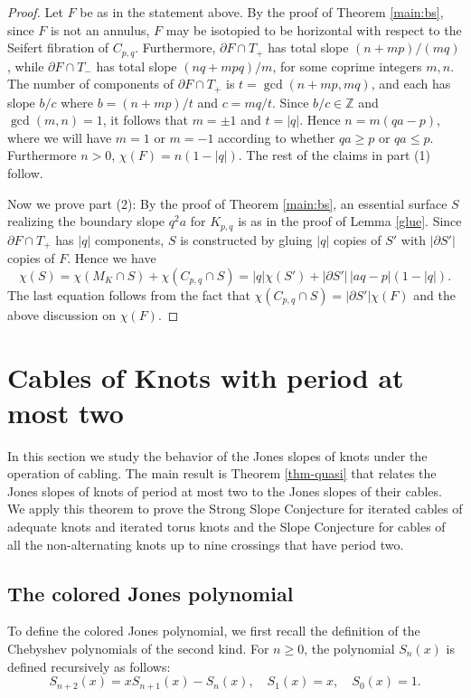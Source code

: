 \documentclass[11pt]{amsart}
\theoremstyle{definition}
\newcommand{\ZZ}{{\mathbb{Z}}}
\newcommand{\C}{{C_{p, q}}}
\newcommand{\K}{{K_{p, q}}}
\newcommand{\abs}[1]{{\left\vert #1 \right\vert}}
\begin{document}
\begin{proof} Let $F$ be as in the statement above.
By the proof of Theorem \ref{main:bs}, since $F$ is not an annulus, $ F$ may be isotopied to be horizontal with respect to the Seifert fibration of $\C$.
Furthermore, $\partial F\cap T_{+}$
has total  slope  $(n+mp)/(mq)$, while 
$\partial F\cap T_{-}$ has total slope  $ (nq +mpq)/m$,
for some coprime  integers $m,n$.
The number of components of $\partial F\cap T_{+}$ is $t= \gcd(n+mp, mq)$,
and each has slope $b/c$ where $b=(n+mp)/t$ and $c=mq/t$.
Since  $b/c\in \ZZ$ and $\gcd(m,n)=1$, it follows that $m=\pm1$ and $t=\abs{q}$.
Hence 
 $n=m(qa-p)$, where we will have $m=1$ or $m=-1$ according to whether $qa\geq p$
or $qa\leq p$. Furthermore $n>0$, $\chi(F)=n(1-\abs{q})$. 
The rest of the claims  in part (1) follow.

Now we prove part (2): By the proof of Theorem \ref{main:bs}, an essential  surface $S$ realizing the boundary slope $q^2a$ for $\K$ 
is as in the proof of Lemma \ref{glue}. Since   $\partial F\cap T_{+}$  has $\abs{q}$ components, $S$ is constructed by 
gluing  $\abs{q}$ copies of $S'$ with $ \abs{ \partial S'}$ copies of $F$. Hence we have
$$\chi(S)=\chi(M_K\cap S)+\chi(\C \cap S)=\abs{q}  \chi(S')+\abs{\partial S'} \, \abs{aq-p} (1- \abs{q} ).$$
The last equation follows from the fact that
$\chi(\C \cap S)=\abs{\partial S'}  \chi(F)$ and the above discussion on
  $\chi(F)$.
\end{proof}




\section{Cables of Knots with period at most two}
\label{cjp} In this section we study the behavior of  the Jones slopes of  knots under the operation of cabling. The main result is Theorem
\ref{thm-quasi} that relates the Jones slopes of knots of period at most two to the Jones slopes of their cables. We apply this theorem to prove the Strong Slope Conjecture for iterated cables of adequate knots and  iterated torus knots and the Slope Conjecture for cables of all the non-alternating knots up to nine crossings that have period two.



 \subsection{The colored Jones polynomial} To define the colored Jones polynomial, we first recall the definition of the Chebyshev polynomials of the second kind. For $n \ge 0$, the polynomial $S_n(x)$ is defined recursively as follows:
\begin{equation}
\label{chev}
S_{n+2}(x)=xS_{n+1}(x)-S_{n}(x), \quad S_1(x)=x, \quad S_0(x)=1.
\end{equation}
\end{document}
